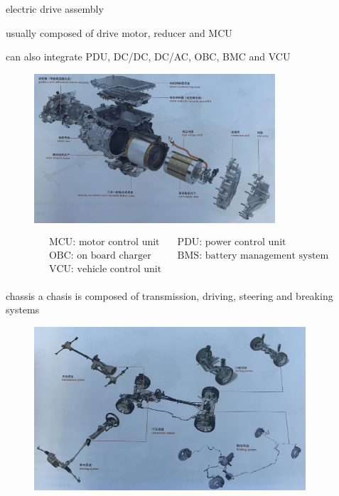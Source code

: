 \begin{frame}
	\begin{block}{}
		\begin{compactitem}
			\item electric drive assembly
			
			{\footnotesize usually composed of drive motor, reducer and MCU 
				
				can also integrate PDU, DC/DC, DC/AC, OBC, BMC and VCU}
				\begin{figure}[htbp]
					\centering	
					\includegraphics[width=0.8\textwidth]{1-8}
				\end{figure}
		\end{compactitem}
	\end{block}
\end{frame}
\begin{frame}
	\begin{block}{}
		{
			\footnotesize
			\begin{align*}
				& \text{MCU: motor control unit} & &\text{PDU: power control unit} \\
				& \text{OBC: on board charger} & &\text{BMS: battery management system} \\
				& \text{VCU: vehicle control unit} \\
			\end{align*}
		}
	\end{block}
\end{frame}
\begin{frame}
	\begin{block}{chassis}
		a chasis is composed of transmission, driving, steering and breaking systems
		\begin{figure}[htbp]
			\centering
			\includegraphics[width=0.9\textwidth]{1-9}
		\end{figure}
	\end{block}
\end{frame}

